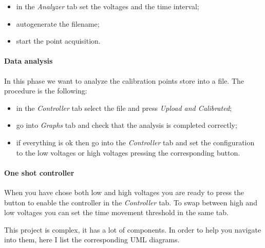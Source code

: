 \begin{itemize}
  \itemsep1pt\parskip0pt
  \item
        in the \emph{Analyzer} tab set the voltages and the time interval;
  \item
        autogenerate the filename;
  \item
        start the point acquisition.
\end{itemize}

\paragraph{Data analysis}

In this phase we want to analyze the calibration points store into a
file. The procedure is the following:

\begin{itemize}
  \itemsep1pt\parskip0pt
  \item
        in the \emph{Controller} tab select the file and press \emph{Upload
          and Calibrated};
  \item
        go into \emph{Graphs} tab and check that the analysis is completed
        correctly;
  \item
        if everything is ok then go into the \emph{Controller} tab and set the
        configuration to the low voltages or high voltages pressing the
        corresponding button.
\end{itemize}

\paragraph{One shot controller}

When you have chose both low and high voltages you are ready to press
the button to enable the controller in the \emph{Controller} tab. To
swap between high and low voltages you can set the time movement
threshold in the same tab.


This project is complex, it has a lot of components. In order to help
you navigate into them, here I list the corresponding UML diagrams.
















